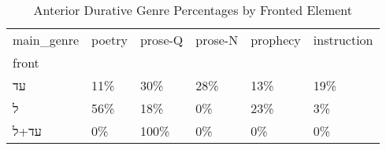 \begin{table}[htbp!]
\centering
\caption{Anterior Durative Genre Percentages by Fronted Element}
\label{table:antdur_gen_pc}
\begin{tabular}{llllll}
\toprule
main\_genre & poetry & prose-Q & prose-N & prophecy & instruction \\
front &        &         &         &          &             \\
\midrule
עד    &    11\% &     30\% &     28\% &      13\% &         19\% \\
ל     &    56\% &     18\% &      0\% &      23\% &          3\% \\
עד+ל  &     0\% &    100\% &      0\% &       0\% &          0\% \\
\bottomrule
\end{tabular}
\end{table}
